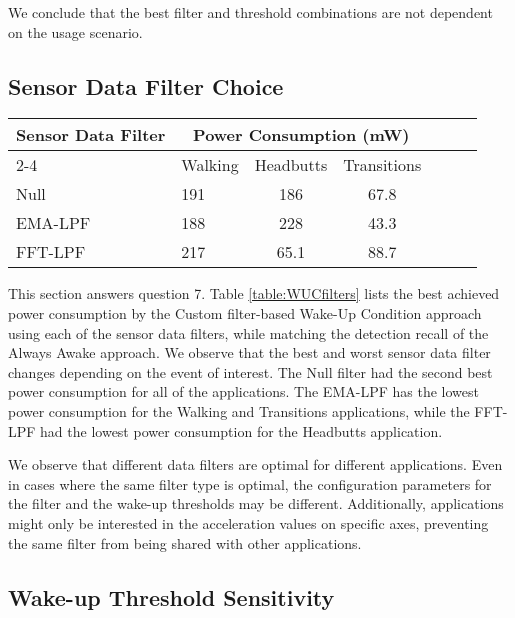 We conclude that the best filter and threshold combinations are not dependent on the usage scenario.

\subsection{Sensor Data Filter Choice}

\begin{table*}[t]
    \begin{tabular}{|l|l|c|c|c|c|c|}
	\hline
    \multirow{2}{*}{Sensor Data Filter}    	& \multicolumn{3}{c|}{Power Consumption (mW)} \\ \cline{2-4}
							& Walking	& Headbutts	& Transitions 	\\ \hline
    Null     				& 191		& 186		& 67.8 			\\ \hline
	EMA-LPF   				& 188		& 228		& 43.3 			\\ \hline
	FFT-LPF 				& 217		& 65.1 		& 88.7 			\\ \hline
	
    \end{tabular}
	\caption{Summary of best achieved power consumption for each of the sensor data filters for Group 2}
	\label{table:WUCfilters}
\end{table*}

This section answers question 7. Table \ref{table:WUCfilters} lists the best achieved power consumption by the Custom filter-based Wake-Up Condition approach using each of the sensor data filters, while matching the detection recall of the Always Awake approach. We observe that the best and worst sensor data filter changes depending on the event of interest. The Null filter had the second best power consumption for all of the applications. The EMA-LPF has the lowest power consumption for the Walking and Transitions applications, while the FFT-LPF had the lowest power consumption for the Headbutts application. 

We observe that different data filters are optimal for different applications. Even in cases where the same filter type is optimal, the configuration parameters for the filter and the wake-up thresholds may be different. Additionally, applications might only be interested in the acceleration values on specific axes, preventing the same filter from being shared with other applications.

\subsection{Wake-up Threshold Sensitivity}

